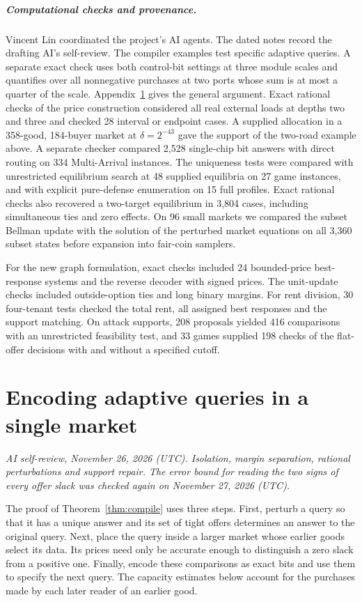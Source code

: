 \documentclass[11pt,oneside,openany,notitlepage]{report}
\newcommand{\reviewdate}{November 26, 2026 (UTC)}
\newcommand{\reviewmark}[1]{\par\nopagebreak[4]\noindent
  {\footnotesize\itshape AI self-review, \reviewdate. #1\par}\nobreak\smallskip}
\begin{document}
\paragraph{Computational checks and provenance.}
Vincent Lin coordinated the project's AI agents. The dated notes record
the drafting AI's self-review. The compiler examples test specific
adaptive queries. A separate exact check uses both control-bit settings
at three module scales and quantifies over all nonnegative purchases at
two ports whose sum is at most a quarter of the scale.
Appendix~\ref{sec:compile} gives the general argument. Exact
rational checks of the price construction considered all real external loads
at depths two and three and checked 28 interval or endpoint cases. A supplied
allocation in a 358-good, 184-buyer market at \(\delta=2^{-43}\) gave the
support of the two-road example above. A separate checker compared 2,528
single-chip bit answers with direct routing on 334 Multi-Arrival instances.
The uniqueness tests were compared with unrestricted equilibrium search at
48 supplied equilibria on 27 game instances, and with explicit pure-defense
enumeration on 15 full profiles. Exact rational checks also recovered a
two-target equilibrium in 3,804 cases, including simultaneous ties and
zero effects. On 96 small markets we compared the subset Bellman update
with the solution of the perturbed market equations on all 3,360 subset
states before expansion into fair-coin samplers.

For the new graph formulation, exact checks included 24 bounded-price
best-response systems and the reverse decoder with signed prices. The
unit-update checks included outside-option ties and long binary margins.
For rent division, 30 four-tenant tests checked the total rent, all
assigned best responses and the support matching. On attack supports,
208 proposals yielded 416 comparisons with an unrestricted feasibility
test, and 33 games supplied 198 checks of the flat-offer decisions with
and without a specified cutoff.

\appendix
\chapter{Encoding adaptive queries in a single market}\label{sec:compile}
\reviewmark{Isolation, margin separation, rational perturbations and support repair. The error bound for reading the two signs of every offer slack was checked again on November 27, 2026 (UTC).}

The proof of Theorem~\ref{thm:compile} uses three steps. First, perturb a
query so that it has a unique answer and its set of tight offers determines
an answer to the original query. Next, place the query inside a larger market
whose earlier goods select its data. Its prices need only be accurate enough
to distinguish a zero slack from a positive one. Finally, encode these
comparisons as exact bits and use them to specify the next query. The
capacity estimates below account for the purchases made by each later
reader of an earlier good.
\end{document}
